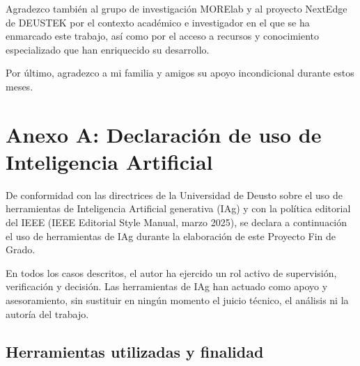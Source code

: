 \documentclass{memoriaPFC}
\begin{document}
Agradezco también al grupo de investigación MORElab y al proyecto NextEdge de DEUSTEK
por el contexto académico e investigador en el que se ha enmarcado este trabajo, así
como por el acceso a recursos y conocimiento especializado que han enriquecido su desarrollo.

Por último, agradezco a mi familia y amigos su apoyo incondicional durante estos meses.


\appendix

\clearpage
{}
{}
\chapter*{Anexo A: Declaración de uso de Inteligencia Artificial}

De conformidad con las directrices de la Universidad de Deusto sobre el uso de
herramientas de Inteligencia Artificial generativa (IAg) y con la política editorial
del IEEE (IEEE Editorial Style Manual, marzo 2025), se declara a continuación el uso
de herramientas de IAg durante la elaboración de este Proyecto Fin de Grado.

En todos los casos descritos, el autor ha ejercido un rol activo de supervisión,
verificación y decisión. Las herramientas de IAg han actuado como apoyo y asesoramiento,
sin sustituir en ningún momento el juicio técnico, el análisis ni la autoría del trabajo.

\section*{Herramientas utilizadas y finalidad}
\end{document}
